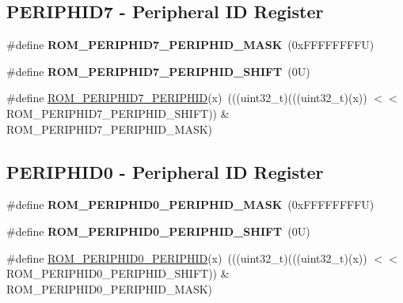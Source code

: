\subsection*{P\+E\+R\+I\+P\+H\+I\+D7 -\/ Peripheral ID Register}
\begin{DoxyCompactItemize}
\item 
\mbox{\label{group___m_t_b___register___masks_ga46d62ff696136480044fa6bd78597be6}} 
\#define {\bfseries R\+O\+M\+\_\+\+P\+E\+R\+I\+P\+H\+I\+D7\+\_\+\+P\+E\+R\+I\+P\+H\+I\+D\+\_\+\+M\+A\+SK}~(0x\+F\+F\+F\+F\+F\+F\+F\+F\+U)
\item 
\mbox{\label{group___m_t_b___register___masks_ga660f3354bf252cb5c5a72b828ba683bd}} 
\#define {\bfseries R\+O\+M\+\_\+\+P\+E\+R\+I\+P\+H\+I\+D7\+\_\+\+P\+E\+R\+I\+P\+H\+I\+D\+\_\+\+S\+H\+I\+FT}~(0\+U)
\item 
\#define \mbox{\hyperlink{group___m_t_b___register___masks_ga954df1566228d34b0f016073d865e878}{R\+O\+M\+\_\+\+P\+E\+R\+I\+P\+H\+I\+D7\+\_\+\+P\+E\+R\+I\+P\+H\+ID}}(x)~(((uint32\+\_\+t)(((uint32\+\_\+t)(x)) $<$$<$ R\+O\+M\+\_\+\+P\+E\+R\+I\+P\+H\+I\+D7\+\_\+\+P\+E\+R\+I\+P\+H\+I\+D\+\_\+\+S\+H\+I\+FT)) \& R\+O\+M\+\_\+\+P\+E\+R\+I\+P\+H\+I\+D7\+\_\+\+P\+E\+R\+I\+P\+H\+I\+D\+\_\+\+M\+A\+SK)
\end{DoxyCompactItemize}
\subsection*{P\+E\+R\+I\+P\+H\+I\+D0 -\/ Peripheral ID Register}
\begin{DoxyCompactItemize}
\item 
\mbox{\label{group___m_t_b___register___masks_ga2dfed5a6af54f8d29e984653d14a2d1a}} 
\#define {\bfseries R\+O\+M\+\_\+\+P\+E\+R\+I\+P\+H\+I\+D0\+\_\+\+P\+E\+R\+I\+P\+H\+I\+D\+\_\+\+M\+A\+SK}~(0x\+F\+F\+F\+F\+F\+F\+F\+F\+U)
\item 
\mbox{\label{group___m_t_b___register___masks_gaacd7e0172c630fb56d8d465c16111feb}} 
\#define {\bfseries R\+O\+M\+\_\+\+P\+E\+R\+I\+P\+H\+I\+D0\+\_\+\+P\+E\+R\+I\+P\+H\+I\+D\+\_\+\+S\+H\+I\+FT}~(0\+U)
\item 
\#define \mbox{\hyperlink{group___m_t_b___register___masks_ga4e81784ff5ff7bb04e70159467a44e6f}{R\+O\+M\+\_\+\+P\+E\+R\+I\+P\+H\+I\+D0\+\_\+\+P\+E\+R\+I\+P\+H\+ID}}(x)~(((uint32\+\_\+t)(((uint32\+\_\+t)(x)) $<$$<$ R\+O\+M\+\_\+\+P\+E\+R\+I\+P\+H\+I\+D0\+\_\+\+P\+E\+R\+I\+P\+H\+I\+D\+\_\+\+S\+H\+I\+FT)) \& R\+O\+M\+\_\+\+P\+E\+R\+I\+P\+H\+I\+D0\+\_\+\+P\+E\+R\+I\+P\+H\+I\+D\+\_\+\+M\+A\+SK)
\end{DoxyCompactItemize}
